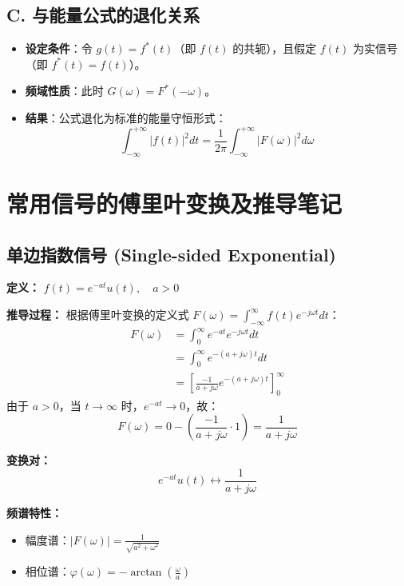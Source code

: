 \subsection*{C. 与能量公式的退化关系}
\begin{itemize}
    \item \textbf{设定条件}：令 $g(t) = f^*(t)$（即 $f(t)$ 的共轭），且假定 $f(t)$ 为实信号（即 $f^*(t)=f(t)$）。
    \item \textbf{频域性质}：此时 $G(\omega) = F^*(-\omega)$。
    \item \textbf{结果}：公式退化为标准的能量守恒形式：
    \begin{equation*}
        \int_{-\infty}^{+\infty} |f(t)|^2 dt = \frac{1}{2\pi} \int_{-\infty}^{+\infty} |F(\omega)|^2 d\omega
    \end{equation*}
\end{itemize}

\section{常用信号的傅里叶变换及推导笔记}

\subsection{单边指数信号 (Single-sided Exponential)}
\textbf{定义：} $f(t) = e^{-at}u(t), \quad a > 0$

\textbf{推导过程：}
根据傅里叶变换的定义式 $F(\omega) = \int_{-\infty}^{\infty} f(t)e^{-j\omega t} dt$：
\begin{align*}
    F(\omega) &= \int_{0}^{\infty} e^{-at} e^{-j\omega t} dt \\
    &= \int_{0}^{\infty} e^{-(a+j\omega)t} dt \\
    &= \left[ \frac{-1}{a+j\omega} e^{-(a+j\omega)t} \right]_{0}^{\infty}
\end{align*}
由于 $a>0$，当 $t \to \infty$ 时，$e^{-at} \to 0$，故：
\begin{equation}
    F(\omega) = 0 - \left( \frac{-1}{a+j\omega} \cdot 1 \right) = \frac{1}{a+j\omega}
\end{equation}

\textbf{变换对：}
\[ e^{-at}u(t) \longleftrightarrow \frac{1}{a+j\omega} \]

\textbf{频谱特性：}
\begin{itemize}
    \item 幅度谱：$|F(\omega)| = \frac{1}{\sqrt{a^2 + \omega^2}}$
    \item 相位谱：$\varphi(\omega) = -\arctan\left(\frac{\omega}{a}\right)$
\end{itemize}

